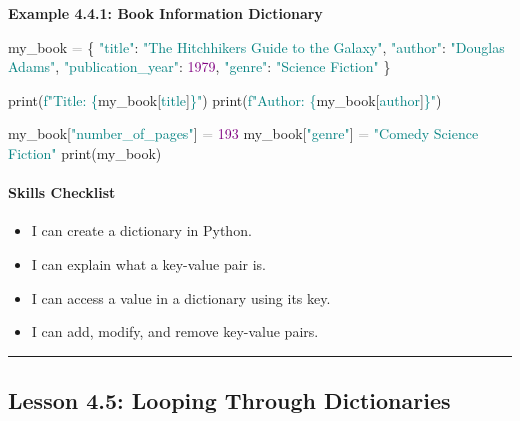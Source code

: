 \documentclass[
  justified,
  openright,
]{tufte-book}
\let\subsubsection\paragraph
\let\paragraph\paragraph
\newcommand{\BuiltInTok}[1]{#1}
\newcommand{\DecValTok}[1]{\textcolor{Purple}{#1}}
\newcommand{\NormalTok}[1]{#1}
\newcommand{\OperatorTok}[1]{\textcolor{DarkGray}{#1}}
\newcommand{\SpecialCharTok}[1]{\textcolor{Teal}{#1}}
\newcommand{\SpecialStringTok}[1]{\textcolor{Teal}{#1}}
\newcommand{\StringTok}[1]{\textcolor{Teal}{#1}}
\newenvironment{Shaded}{%
  \begin{snugshade}
}{%
  \end{snugshade}
}
\let\subsubsection\paragraph
\let\paragraph\paragraph
\providecommand{\tightlist}{%
  \setlength{\itemsep}{0pt}\setlength{\parskip}{0pt}}
\begin{document}
\textbf{Example 4.4.1: Book Information Dictionary}

\begin{Shaded}
\begin{Highlighting}[]
\NormalTok{my\_book }\OperatorTok{=}\NormalTok{ \{}
    \StringTok{"title"}\NormalTok{: }\StringTok{"The Hitchhiker\textquotesingle{}s Guide to the Galaxy"}\NormalTok{,}
    \StringTok{"author"}\NormalTok{: }\StringTok{"Douglas Adams"}\NormalTok{,}
    \StringTok{"publication\_year"}\NormalTok{: }\DecValTok{1979}\NormalTok{,}
    \StringTok{"genre"}\NormalTok{: }\StringTok{"Science Fiction"}
\NormalTok{\}}

\BuiltInTok{print}\NormalTok{(}\SpecialStringTok{f"Title: }\SpecialCharTok{\{}\NormalTok{my\_book[}\StringTok{\textquotesingle{}title\textquotesingle{}}\NormalTok{]}\SpecialCharTok{\}}\SpecialStringTok{"}\NormalTok{)}
\BuiltInTok{print}\NormalTok{(}\SpecialStringTok{f"Author: }\SpecialCharTok{\{}\NormalTok{my\_book[}\StringTok{\textquotesingle{}author\textquotesingle{}}\NormalTok{]}\SpecialCharTok{\}}\SpecialStringTok{"}\NormalTok{)}

\NormalTok{my\_book[}\StringTok{"number\_of\_pages"}\NormalTok{] }\OperatorTok{=} \DecValTok{193}
\NormalTok{my\_book[}\StringTok{"genre"}\NormalTok{] }\OperatorTok{=} \StringTok{"Comedy Science Fiction"}
\BuiltInTok{print}\NormalTok{(my\_book)}
\end{Highlighting}
\end{Shaded}

\subsubsection{Skills Checklist}\label{skills-checklist-20}

\begin{itemize}
\tightlist
\item[$\square$]
  I can create a dictionary in Python.
\item[$\square$]
  I can explain what a key-value pair is.
\item[$\square$]
  I can access a value in a dictionary using its key.
\item[$\square$]
  I can add, modify, and remove key-value pairs.
\end{itemize}

\begin{center}\rule{0.5\linewidth}{0.5pt}\end{center}

\subsection{Lesson 4.5: Looping Through
Dictionaries}\label{lesson-4.5-looping-through-dictionaries}
\end{document}
